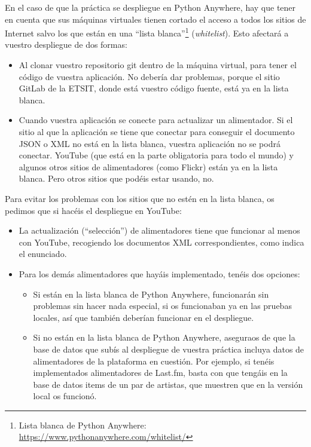 En el caso de que la práctica se despliegue en Python Anywhere, hay que tener en cuenta que sus máquinas virtuales tienen cortado el acceso a todos los sitios de Internet salvo los que están en una ``lista blanca''\footnote{Lista blanca de Python Anywhere: \url{https://www.pythonanywhere.com/whitelist/}} (\emph{whitelist}). Esto afectará a vuestro despliegue de dos formas:

\begin{itemize}
\item Al clonar vuestro repositorio git dentro de la máquina virtual, para tener el código de vuestra aplicación. No debería dar problemas, porque el sitio GitLab de la ETSIT, donde está vuestro código fuente, está ya en la lista blanca.
\item Cuando vuestra aplicación se conecte para actualizar un alimentador. Si el sitio al que la aplicación se tiene que conectar para conseguir el documento JSON o XML no está en la lista blanca, vuestra aplicación no se podrá conectar. YouTube (que está en la parte obligatoria para todo el mundo) y algunos otros sitios de alimentadores (como Flickr) están ya en la lista blanca. Pero otros sitios que podéis estar usando, no.
\end{itemize}

Para evitar los problemas con los sitios que no estén en la lista blanca, os pedimos que si hacéis el despliegue en YouTube:

\begin{itemize}
\item La actualización (``selección'') de alimentadores tiene que funcionar al menos con YouTube, recogiendo los documentos XML correspondientes, como indica el enunciado.
\item Para los demás alimentadores que hayáis implementado, tenéis dos opciones:
  \begin{itemize}
  \item Si están en la lista blanca de Python Anywhere, funcionarán sin problemas sin hacer nada especial, si os funcionaban ya en las pruebas locales, así que también deberían funcionar en el despliegue.
  \item Si no están en la lista blanca de Python Anywhere, aseguraos de que la base de datos que subís al despliegue de vuestra práctica incluya datos de alimentadores de la plataforma en cuestión. Por ejemplo, si tenéis implementados alimentadores de Last.fm, basta con que tengáis en la base de datos items de un par de artistas, que muestren que en la versión local os funcionó.
  \end{itemize}
\end{itemize}


